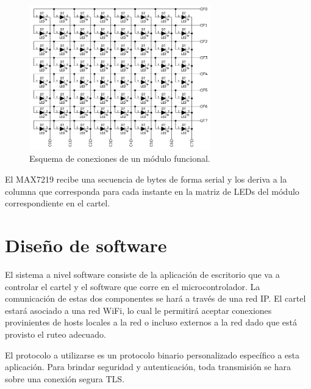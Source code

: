 \begin{figure}[ht!]
	\begin{center}
		\includegraphics[width=0.7\textwidth]{imagenes/hw/moduloLED}
		\caption{Esquema de conexiones de un módulo funcional.}
		\label{fig:hw-moduloLED}
	\end{center}
\end{figure}

El MAX7219 recibe una secuencia de bytes de forma serial y los deriva a la columna que corresponda para cada instante en la matriz de LEDs del módulo correspondiente en el cartel. 

\section{Diseño de software}
El sistema a nivel software consiste de la aplicación de escritorio que va a controlar el cartel y el software que corre en el microcontrolador.
La comunicación de estas dos componentes se hará a través de una red IP. El cartel estará asociado a una red WiFi, lo cual le permitirá aceptar conexiones provinientes de hosts locales a la red o incluso externos a la red dado que está provisto el ruteo adecuado. 

El protocolo a utilizarse es un protocolo binario personalizado específico a esta aplicación. Para brindar seguridad y autenticación, toda transmisión se hara sobre una conexión segura TLS. 

